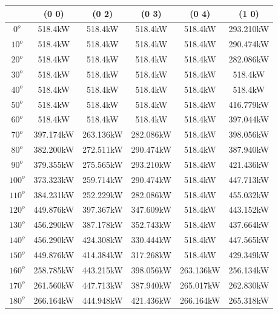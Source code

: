         \singlespacing
        \begin{table}[H]
        	\centering
        	\begin{tabular}{|c|c|c|c|c|c|} \hline
        			& (0 0)		& (0 2)		& (0 3)		& (0 4)		& (1 0)		\\ \hline
        		$0^o$	& 518.4kW	& 518.4kW	& 518.4kW	& 518.4kW	& 293.210kW	\\ \hline
        		$10^o$	& 518.4kW	& 518.4kW	& 518.4kW	& 518.4kW	& 290.474kW	\\ \hline
        		$20^o$	& 518.4kW	& 518.4kW	& 518.4kW	& 518.4kW	& 282.086kW	\\ \hline
        		$30^o$	& 518.4kW	& 518.4kW	& 518.4kW	& 518.4kW	& 518.4kW	\\ \hline
        		$40^o$	& 518.4kW	& 518.4kW	& 518.4kW	& 518.4kW	& 518.4kW	\\ \hline
        		$50^o$	& 518.4kW	& 518.4kW	& 518.4kW	& 518.4kW	& 416.779kW	\\ \hline
        		$60^o$	& 518.4kW	& 518.4kW	& 518.4kW	& 518.4kW	& 397.044kW	\\ \hline
        		$70^o$	& 397.174kW	& 263.136kW	& 282.086kW	& 518.4kW	& 398.056kW	\\ \hline
        		$80^o$	& 382.200kW	& 272.511kW	& 290.474kW	& 518.4kW	& 387.940kW	\\ \hline
        		$90^o$	& 379.355kW	& 275.565kW	& 293.210kW	& 518.4kW	& 421.436kW	\\ \hline
        		$100^o$	& 373.323kW	& 259.714kW	& 290.474kW	& 518.4kW	& 447.713kW	\\ \hline
        		$110^o$	& 384.231kW	& 252.229kW	& 282.086kW	& 518.4kW	& 455.032kW	\\ \hline
        		$120^o$	& 449.876kW	& 397.367kW	& 347.609kW	& 518.4kW	& 443.152kW	\\ \hline
        		$130^o$	& 456.290kW	& 387.178kW	& 352.743kW	& 518.4kW	& 437.664kW	\\ \hline
        		$140^o$	& 456.290kW	& 424.308kW	& 330.444kW	& 518.4kW	& 447.565kW	\\ \hline
        		$150^o$	& 449.876kW	& 414.384kW	& 317.268kW	& 518.4kW	& 429.349kW	\\ \hline
        		$160^o$	& 258.785kW	& 443.215kW	& 398.056kW	& 263.136kW	& 256.134kW	\\ \hline
        		$170^o$	& 261.560kW	& 447.713kW	& 387.940kW	& 265.017kW	& 262.830kW	\\ \hline
        		$180^o$	& 266.164kW	& 444.948kW	& 421.436kW	& 266.164kW	& 265.318kW	\\ \hline

\end{tabular}
\end{table}
